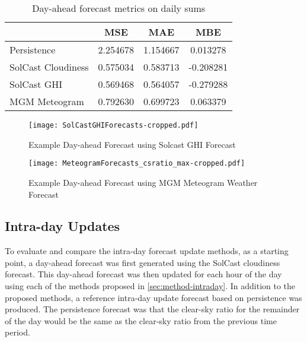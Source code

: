 \begin{table}[tbh]
	\centering
	\caption{Day-ahead forecast metrics on daily sums}
	\label{table:dayahead-metrics-sum}
	\begin{tabular}{lccc}
		\toprule
		                       &   MSE    &   MAE    &    MBE    \\
        \midrule
		Persistence & 2.254678 & 1.154667 & 0.013278 \\
		SolCast Cloudiness & 0.575034 & 0.583713 & -0.208281 \\
		SolCast GHI & 0.569468 & 0.564057 & -0.279288 \\
		MGM Meteogram & 0.792630 & 0.699723 & 0.063379 \\
		\bottomrule
	\end{tabular}
\end{table}

\begin{figure}[tbh]
	\centering
	\texttt{[image: SolCastGHIForecasts-cropped.pdf]}
	\caption{Example Day-ahead Forecast using Solcast GHI Forecast}
	\label{fig:dayahead-forecast-solcast}
\end{figure}


\begin{figure}[tbh]
	\centering
	\texttt{[image: MeteogramForecasts\_csratio\_max-cropped.pdf]}
	\caption{Example Day-ahead Forecast using MGM Meteogram Weather Forecast}
	\label{fig:dayahead-forecast-meteogram}
\end{figure}


\subsection{Intra-day Updates}

To evaluate and compare the intra-day forecast update methods,
as a starting point, a day-ahead forecast was first generated using the
SolCast cloudiness forecast.
This day-ahead forecast was then updated for each hour of the day using each of the methods proposed in \cref{sec:method-intraday}.
In addition to the proposed methods, a reference intra-day update forecast based on persistence was produced.
The persistence forecast was that the clear-sky ratio for the remainder of the day would be the same as the clear-sky ratio from the previous time period.

